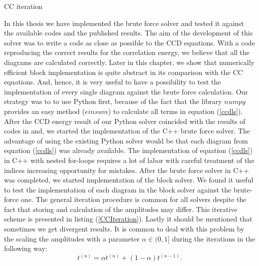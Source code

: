 \documentclass[twoside,english]{uiofysmaster}
\begin{document}
\IncMargin{1em}
\begin{algorithm}[H]
	\BlankLine
	\caption{CC iteration}\label{CCIteration}
\end{algorithm}\DecMargin{1em}

In this thesis we have implemented the brute force solver and tested
it against the available codes and the published results. The aim of
the development of this solver was to write a code as close as
possible to the CCD equations. With a code reproducing the correct
results for the correlation energy, we believe that all the diagrams
are calculated correctly. Later in this chapter, we show that
numerically efficient block implementation is quite abstract in its
comparison with the CC equations. And, hence, it is very useful to
have a possibility to test the implementation of every single diagram
against the brute force calculation.  Our strategy was to to use
Python first, because of the fact that the library $numpy$ provides an easy
method ($einsum$) to calculate all terms in equation
(\ref{ccdls}). After the CCD energy result of our Python solver
coincided with the results of codes in
\cite{Hjorth-Jensenadvancedcoursecomputational2017} and, we started the implementation of the C++ brute force
solver. The advantage of using the existing Python solver would be
that  each diagram from equation (\ref{ccdls}) was already
available. The implementation of equation (\ref{ccdls}) in C++ with
nested for-loops requires a lot of labor with careful treatment of the
indices increasing opportunity for mistakes. After the brute force
solver in C++ was completed, we started implementation of the block
solver. We found it useful to test the implementation of each diagram
in the block solver against the brute-force one.  The general
iteration procedure is common for all solvers despite the fact that
storing and calculation of the amplitudes may differ. This iterative
scheme is presented in listing (\ref{CCIteration}).  Lastly it should
be mentioned that sometimes we get divergent results. It is common to
deal with this problem by the scaling the amplitudes with a parameter
$\alpha \in (0,1]$ during the iterations in the following way:
\begin{equation}
t^{(n)} = \alpha t^{(n)} + (1 - \alpha)t^{(n-1)}.
\end{equation} 
\end{document}
